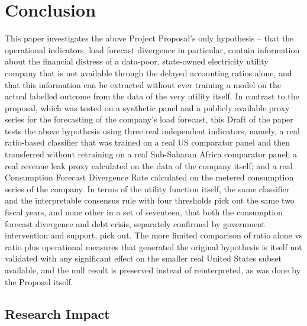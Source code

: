 \documentclass[final,1p,times]{elsarticle}
\begin{document}
\section{Conclusion}
\label{S:conclusion}

This paper investigates the above Project Proposal’s only hypothesis – that the operational indicators, load forecast divergence in particular, contain information about the financial distress of a data-poor, state-owned electricity utility company that is not available through the delayed accounting ratios alone, and that this information can be extracted without ever training a model on the actual labelled outcome from the data of the very utility itself. In contrast to the proposal, which was tested on a synthetic panel and a publicly available proxy series for the forecasting of the company’s load forecast, this Draft of the paper tests the above hypothesis using three real independent indicators, namely, a real ratio-based classifier that was trained on a real US comparator panel and then transferred without retraining on a real Sub-Saharan Africa comparator panel; a real revenue leak proxy calculated on the data of the company itself; and a real Consumption Forecast Divergence Rate calculated on the metered consumption series of the company. In terms of the utility function itself, the same classifier and the interpretable consensus rule with four thresholds pick out the same two fiscal years, and none other in a set of seventeen, that both the consumption forecast divergence and debt crisis, separately confirmed by government intervention and support, pick out. The more limited comparison of ratio alone vs ratio plus operational measures that generated the original hypothesis is itself not validated with any significant effect on the smaller real United States subset available, and the null result is preserved instead of reinterpreted, as was done by the Proposal itself.

\subsection{Research Impact}
\label{S:impact}
\end{document}

